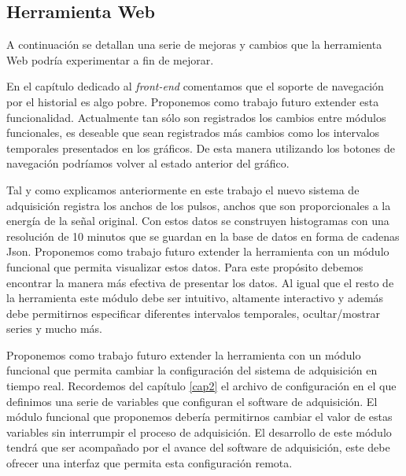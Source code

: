 	\subsection{Herramienta Web}
		A continuación se detallan una serie de mejoras y cambios que la herramienta Web podría experimentar a fin de mejorar.
		\begin{description}[style=unboxed,leftmargin=0cm,labelwidth=1cm]
			\item[Extender el soporte de navegación por el historial]
				En el capítulo dedicado al \emph{front-end} comentamos que el soporte de navegación por el historial es algo pobre.
				Proponemos como trabajo futuro extender esta funcionalidad. Actualmente tan sólo son registrados los cambios entre
				módulos funcionales, es deseable que sean registrados más cambios como los intervalos temporales presentados en los
				gráficos. De esta manera utilizando los botones de navegación podríamos volver al estado anterior del gráfico.
			\item[Anchos de pulso] 
				Tal y como explicamos anteriormente en este trabajo el nuevo sistema de adquisición registra los anchos de los pulsos,
				anchos que son proporcionales a la energía de la señal original. Con estos datos se construyen histogramas con una
				resolución de 10 minutos que se guardan en la base de datos en forma de cadenas Json. Proponemos como trabajo futuro
				extender la herramienta con un módulo funcional que permita visualizar estos datos. Para este propósito debemos
				encontrar la manera más efectiva de presentar los datos. Al igual que el resto de la herramienta este módulo debe ser
				intuitivo, altamente interactivo y además debe permitirnos especificar diferentes intervalos temporales,
				ocultar/mostrar series y mucho más.
			\item[Configuración del sistema de adquisición]
				Proponemos como trabajo futuro extender la herramienta con un módulo funcional que permita cambiar la configuración
				del sistema de adquisición en tiempo real. Recordemos del capítulo \ref{cap2} el archivo de configuración en el que
				definimos una serie de variables que configuran el software de adquisición. El módulo funcional que proponemos debería
				permitirnos cambiar el valor de estas variables sin interrumpir el proceso de adquisición. El desarrollo de este
				módulo tendrá que ser acompañado por el avance del software de adquisición, este debe ofrecer una interfaz que permita
				esta configuración remota.
			\item[Alarmas y Notificación]

\end{description}
